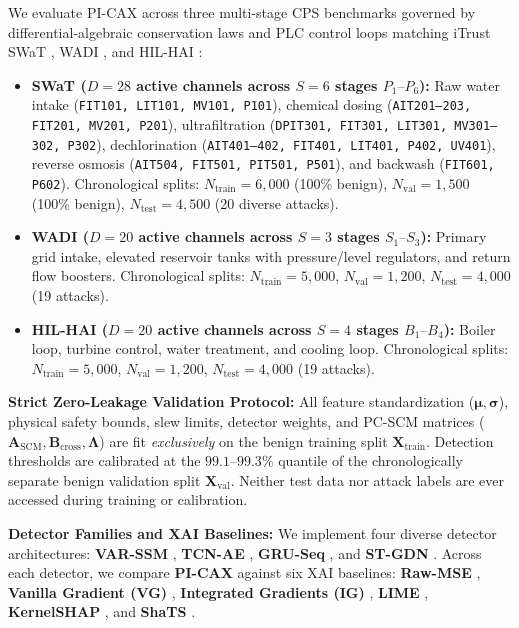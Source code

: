 \documentclass[10pt,a4paper]{article}
\begin{document}
We evaluate PI-CAX across three multi-stage CPS benchmarks governed by differential-algebraic conservation laws and PLC control loops matching iTrust SWaT \cite{deng2021gdn, franco2026shats}, WADI \cite{deng2021gdn, rasheed2026xaicps}, and HIL-HAI \cite{birihanu2024correlation, skrodelis2026review}:
\begin{itemize}\setlength{\itemsep}{2pt}\setlength{\parskip}{0pt}
    \item \textbf{SWaT ($D=28$ active channels across $S=6$ stages $P_1\text{--}P_6$):} Raw water intake (\texttt{FIT101, LIT101, MV101, P101}), chemical dosing (\texttt{AIT201--203, FIT201, MV201, P201}), ultrafiltration (\texttt{DPIT301, FIT301, LIT301, MV301--302, P302}), dechlorination (\texttt{AIT401--402, FIT401, LIT401, P402, UV401}), reverse osmosis (\texttt{AIT504, FIT501, PIT501, P501}), and backwash (\texttt{FIT601, P602}). Chronological splits: $N_{\text{train}}=6{,}000$ (100\% benign), $N_{\text{val}}=1{,}500$ (100\% benign), $N_{\text{test}}=4{,}500$ (20 diverse attacks).
    \item \textbf{WADI ($D=20$ active channels across $S=3$ stages $S_1\text{--}S_3$):} Primary grid intake, elevated reservoir tanks with pressure/level regulators, and return flow boosters. Chronological splits: $N_{\text{train}}=5{,}000$, $N_{\text{val}}=1{,}200$, $N_{\text{test}}=4{,}000$ (19 attacks).
    \item \textbf{HIL-HAI ($D=20$ active channels across $S=4$ stages $B_1\text{--}B_4$):} Boiler loop, turbine control, water treatment, and cooling loop. Chronological splits: $N_{\text{train}}=5{,}000$, $N_{\text{val}}=1{,}200$, $N_{\text{test}}=4{,}000$ (19 attacks).
\end{itemize}

\textbf{Strict Zero-Leakage Validation Protocol:} All feature standardization ($\boldsymbol{\mu}, \boldsymbol{\sigma}$), physical safety bounds, slew limits, detector weights, and PC-SCM matrices ($\mathbf{A}_{\text{SCM}}, \mathbf{B}_{\text{cross}}, \boldsymbol{\Lambda}$) are fit \emph{exclusively} on the benign training split $\mathbf{X}_{\text{train}}$. Detection thresholds are calibrated at the $99.1\text{--}99.3\%$ quantile of the chronologically separate benign validation split $\mathbf{X}_{\text{val}}$. Neither test data nor attack labels are ever accessed during training or calibration.

\textbf{Detector Families and XAI Baselines:} We implement four diverse detector architectures: \textbf{VAR-SSM} \cite{fung2024ndss}, \textbf{TCN-AE} \cite{abudurexiti2025cctak}, \textbf{GRU-Seq} \cite{tang2023grn, franco2026shats}, and \textbf{ST-GDN} \cite{deng2021gdn, rasheed2026xaicps}. Across each detector, we compare \textbf{PI-CAX} against six XAI baselines: \textbf{Raw-MSE} \cite{fung2024ndss}, \textbf{Vanilla Gradient (VG)} \cite{oinonen2026epsr}, \textbf{Integrated Gradients (IG)} \cite{fung2024ndss, mathuros2024waxai}, \textbf{LIME} \cite{mathuros2024waxai, oinonen2026epsr}, \textbf{KernelSHAP} \cite{huong2022fedex, franco2026shats}, and \textbf{ShaTS} \cite{franco2026shats}.
\end{document}

